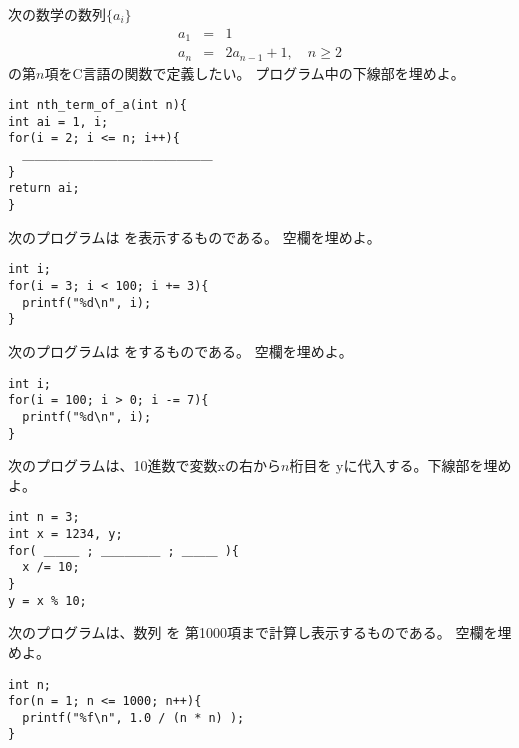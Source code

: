 \documentclass[12pt,a4j]{jarticle}
\newcounter{toi}
\def\toi{%
\bigskip\bigskip\noindent
\addtocounter{toi}{1}
\shadowbox{\bfseries\large 問\thetoi}
\nopagebreak[4]\bigskip\nopagebreak[4]
}
\begin{document}
\toi


次の数学の数列$\{a_i\}$
\begin{eqnarray*}
a_1 &=& 1\\[-7pt]
a_n &=& 2 a_{n-1} + 1, \quad n \ge 2
\end{eqnarray*}
の第$n$項をC言語の関数で定義したい。
プログラム中の下線部を埋めよ。
\begin{verbatim}
int nth_term_of_a(int n){
int ai = 1, i;
for(i = 2; i <= n; i++){
  ＿＿＿＿＿＿＿＿＿＿＿＿＿＿＿＿
}
return ai;
}  
\end{verbatim}




\toi


次のプログラムは
を表示するものである。
空欄を埋めよ。
\begin{verbatim}
int i;
for(i = 3; i < 100; i += 3){
  printf("%d\n", i);
}
\end{verbatim}



\toi


次のプログラムは
をするものである。
空欄を埋めよ。
\begin{verbatim}
int i;
for(i = 100; i > 0; i -= 7){
  printf("%d\n", i);
}
\end{verbatim}




\toi


次のプログラムは、10進数で変数{\ttfamily x}の右から$n$桁目を{\ttfamily
y}に代入する。下線部を埋めよ。
\begin{verbatim}
int n = 3;
int x = 1234, y;
for( ＿＿＿ ; ＿＿＿＿＿ ; ＿＿＿ ){
  x /= 10;
}
y = x % 10;
\end{verbatim}



\toi


次のプログラムは、数列
を
第1000項まで計算し表示するものである。
空欄を埋めよ。
\begin{verbatim}
int n;
for(n = 1; n <= 1000; n++){
  printf("%f\n", 1.0 / (n * n) );
}
\end{verbatim}
\end{document}
